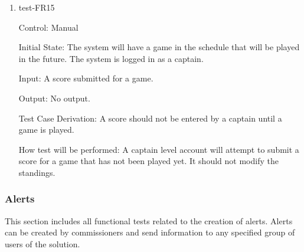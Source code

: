 \documentclass[12pt, titlepage]{article}
\begin{document}
\begin{enumerate}

  \item{test-FR15\\}

  Control: Manual

  Initial State: The system will have a game in the schedule that will be played
  in the future. The system is logged in as a captain.
            
  Input: A score submitted for a game.

  Output: No output.

  Test Case Derivation: A score should not be entered by a captain until a game
  is played.

  How test will be performed: A captain level account will attempt to submit a
  score for a game that has not been played yet. It should not modify the
  standings.

\end{enumerate}

\subsubsection{Alerts}

This section includes all functional tests related to the creation of alerts.
Alerts can be created by commissioners and send information to any specified
group of users of the solution.
\end{document}
